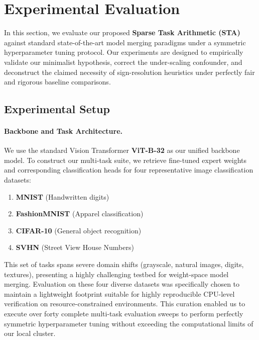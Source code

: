 \section{Experimental Evaluation}
\label{sec:experiments}

In this section, we evaluate our proposed \textbf{Sparse Task Arithmetic (STA)} against standard state-of-the-art model merging paradigms under a symmetric hyperparameter tuning protocol. Our experiments are designed to empirically validate our minimalist hypothesis, correct the under-scaling confounder, and deconstruct the claimed necessity of sign-resolution heuristics under perfectly fair and rigorous baseline comparisons.

\subsection{Experimental Setup}
\paragraph{Backbone and Task Architecture.}
We use the standard Vision Transformer \textbf{ViT-B-32} \cite{Radford2021} as our unified backbone model. To construct our multi-task suite, we retrieve fine-tuned expert weights and corresponding classification heads for four representative image classification datasets:
\begin{enumerate}
    \item \textbf{MNIST} (Handwritten digits)
    \item \textbf{FashionMNIST} (Apparel classification)
    \item \textbf{CIFAR-10} (General object recognition)
    \item \textbf{SVHN} (Street View House Numbers)
\end{enumerate}
This set of tasks spans severe domain shifts (grayscale, natural images, digits, textures), presenting a highly challenging testbed for weight-space model merging. Evaluation on these four diverse datasets was specifically chosen to maintain a lightweight footprint suitable for highly reproducible CPU-level verification on resource-constrained environments. This curation enabled us to execute over forty complete multi-task evaluation sweeps to perform perfectly symmetric hyperparameter tuning without exceeding the computational limits of our local cluster.

